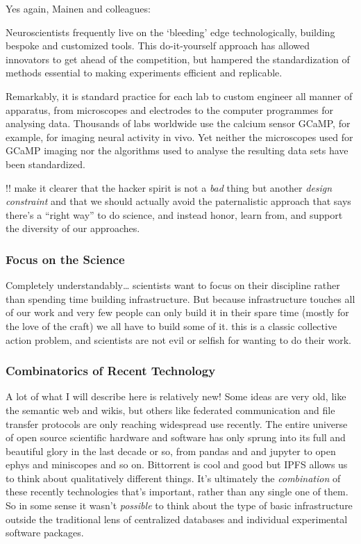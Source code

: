 \documentclass[10pt]{article}
\begin{document}
\begin{multicols}{2}
Yes again, Mainen and colleagues:

\begin{leftbar}
Neuroscientists frequently live on the `bleeding' edge technologically,
building bespoke and customized tools. This do-it-yourself approach has
allowed innovators to get ahead of the competition, but hampered the
standardization of methods essential to making experiments efficient and
replicable.

Remarkably, it is standard practice for each lab to custom engineer all
manner of apparatus, from microscopes and electrodes to the computer
programmes for analysing data. Thousands of labs worldwide use the
calcium sensor GCaMP, for example, for imaging neural activity in vivo.
Yet neither the microscopes used for GCaMP imaging nor the algorithms
used to analyse the resulting data sets have been standardized. \cite{mainenBetterWayCrack2016} 
\end{leftbar}

!! make it clearer that the hacker spirit is not a \emph{bad} thing but
another \emph{design constraint} and that we should actually avoid the
paternalistic approach that says there's a ``right way'' to do science,
and instead honor, learn from, and support the diversity of our
approaches.

\hypertarget{focus-on-the-science}{%
\subsubsection{Focus on the Science}\label{focus-on-the-science}}

Completely understandably\ldots{} scientists want to focus on their
discipline rather than spending time building infrastructure. But
because infrastructure touches all of our work and very few people can
only build it in their spare time (mostly for the love of the craft) we
all have to build some of it. this is a classic collective action
problem, and scientists are not evil or selfish for wanting to do their
work.

\hypertarget{combinatorics-of-recent-technology}{%
\subsubsection{Combinatorics of Recent
Technology}\label{combinatorics-of-recent-technology}}

A lot of what I will describe here is relatively new! Some ideas are
very old, like the semantic web and wikis, but others like federated
communication and file transfer protocols are only reaching widespread
use recently. The entire universe of open source scientific hardware and
software has only sprung into its full and beautiful glory in the last
decade or so, from pandas and and jupyter to open ephys and miniscopes
and so on. Bittorrent is cool and good but IPFS allows us to think about
qualitatively different things. It's ultimately the \emph{combination}
of these recently technologies that's important, rather than any single
one of them. So in some sense it wasn't \emph{possible} to think about
the type of basic infrastructure outside the traditional lens of
centralized databases and individual experimental software packages.


\end{multicols}
\end{document}
